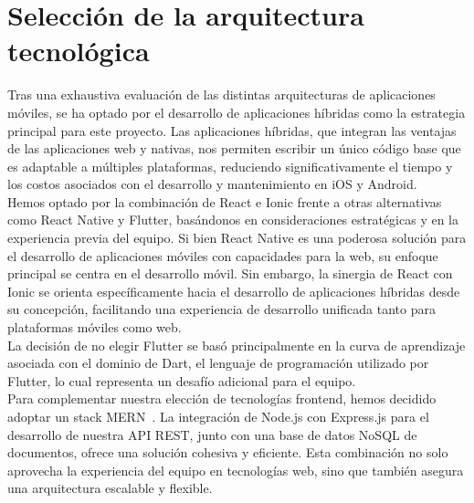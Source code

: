 \section{Selección de la arquitectura tecnológica}
Tras una exhaustiva evaluación de las distintas arquitecturas de aplicaciones móviles, se ha optado por el desarrollo de aplicaciones híbridas como la estrategia principal para este proyecto. Las aplicaciones híbridas, que integran las ventajas de las aplicaciones web y nativas, nos permiten escribir un único código base que es adaptable a múltiples plataformas, reduciendo significativamente el tiempo y los costos asociados con el desarrollo y mantenimiento en iOS y Android.\\[1ex]Hemos optado por la combinación de React e Ionic frente a otras alternativas como React Native y Flutter, basándonos en consideraciones estratégicas y en la experiencia previa del equipo. Si bien React Native es una poderosa solución para el desarrollo de aplicaciones móviles con capacidades para la web, su enfoque principal se centra en el desarrollo móvil. Sin embargo, la sinergia de React con Ionic se orienta específicamente hacia el desarrollo de aplicaciones híbridas desde su concepción, facilitando una experiencia de desarrollo unificada tanto para plataformas móviles como web. \\[1ex]La decisión de no elegir Flutter se basó principalmente en la curva de aprendizaje asociada con el dominio de Dart, el lenguaje de programación utilizado por Flutter, lo cual representa un desafío adicional para el equipo.\\[1ex]Para complementar nuestra elección de tecnologías frontend, hemos decidido adoptar un stack MERN~\cite{mern}. La integración de Node.js con Express.js para el desarrollo de nuestra API REST, junto con una base de datos NoSQL de documentos, ofrece una solución cohesiva y eficiente. Esta combinación no solo aprovecha la experiencia del equipo en tecnologías web, sino que también asegura una arquitectura escalable y flexible.